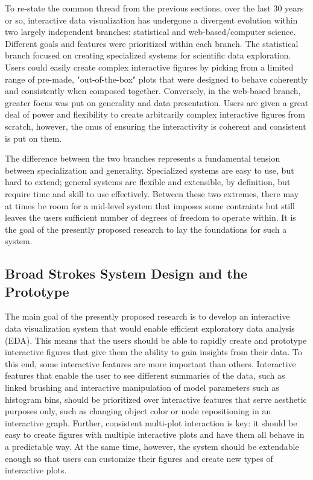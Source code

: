\documentclass[12pt,a4paper]{article}
\begin{document}
To re-state the common thread from the previous sections, over the last 30 years or so, interactive data visualization has undergone a divergent evolution within two largely independent branches: statistical and web-based/computer science. Different goals and features were prioritized within each branch. The statistical branch focused on creating specialized systems for scientific data exploration. Users could easily create complex interactive figures by picking from a limited range of pre-made, "out-of-the-box" plots that were designed to behave coherently and consistently when composed together. Conversely, in the web-based branch, greater focus was put on generality and data presentation. Users are given a great deal of power and flexibility to create arbitrarily complex interactive figures from scratch, however, the onus of ensuring the interactivity is coherent and consistent is put on them.

The difference between the two branches represents a fundamental tension between specialization and generality. Specialized systems are easy to use, but hard to extend; general systems are flexible and extensible, by definition, but require time and skill to use effectively. Between these two extremes, there may at times be room for a mid-level system that imposes some contraints but still leaves the users sufficient number of degrees of freedom to operate within. It is the goal of the presently proposed research to lay the foundations for such a system.

\subsection{Broad Strokes System Design and the Prototype}

The main goal of the presently proposed research is to develop an interactive data visualization system that would enable efficient exploratory data analysis (EDA). This means that the users should be able to rapidly create and prototype interactive figures that give them the ability to gain insights from their data. To this end, some interactive features are more important than others. Interactive features that enable the user to see different summaries of the data, such as linked brushing and interactive manipulation of model parameters such as histogram bins, should be prioritized over interactive features that serve aesthetic purposes only, such as changing object color or node repositioning in an interactive graph. Further, consistent multi-plot interaction is key: it should be easy to create figures with multiple interactive plots and have them all behave in a predictable way. At the same time, however, the system should be extendable enough so that users can customize their figures and create new types of interactive plots. 
\end{document}
